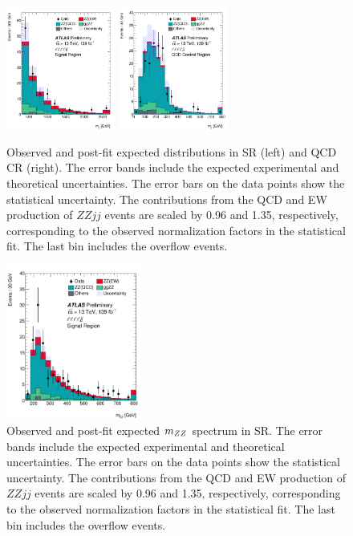 \begin{figure}[!htbp]
\begin{center}
\includegraphics[width=0.32\textwidth]{figures/VBSZZ/fit/MJJ_4l_SR.pdf}
\includegraphics[width=0.32\textwidth]{figures/VBSZZ/fit/MJJ_4l_QCD_CR.pdf}
\end{center}
\caption{Observed and post-fit expected \mjj distributions in SR (left) and QCD CR (right).
        The error bands include the expected experimental and theoretical uncertainties.
        The error bars on the data points show the statistical uncertainty.
        The contributions from the QCD and EW production of $ZZjj$ events are scaled by 0.96 and 1.35, respectively,
        corresponding to the observed normalization factors in the statistical fit.
        The last bin includes the overflow events.
        }
\label{fig:scaled_mjj}
\end{figure}

\begin{figure}[!htbp]
\begin{center}
\includegraphics[width=0.4\textwidth]{figures/VBSZZ/fit/MZZ_4l_SR.pdf}
\end{center}
\caption{Observed and post-fit expected $m_{ZZ}$ spectrum in SR.
        The error bands include the expected experimental and theoretical uncertainties.
        The error bars on the data points show the statistical uncertainty.
        The contributions from the QCD and EW production of $ZZjj$ events are scaled by 0.96 and 1.35, respectively,
        corresponding to the observed normalization factors in the statistical fit.
        The last bin includes the overflow events.
        }
\label{fig:scaled_mzz}
\end{figure}

